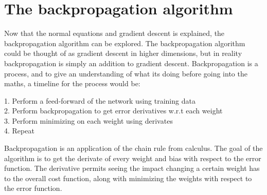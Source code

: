 \documentclass[a4paper,12pt]{article}
\begin{document}
\section{The backpropagation algorithm}
Now that the normal equations and gradient descent is explained, the backpropagation algorithm can be explored. The backpropagation algorithm could be thought of as gradient descent in higher dimensions, but in reality backpropagation is simply an addition to gradient descent. Backpropagation is a process, and to give an understanding of what its doing before going into the maths, a timeline for the process would be: 
\begin{center} 1. Perform a feed-forward of the network using training data
\\ 2. Perform backpropagation to get error derivatives w.r.t each weight
\\ 3. Perform minimizing on each weight using derivates
\\ 4. Repeat\end{center}
Backpropagation is an application of the chain rule from calculus. The goal of the algorithm is to get the derivate of every weight and bias with respect to the error function. The derivative permits seeing the impact changing a certain weight has to the overall cost function, along with minimizing the weights with respect to the error function. 
\end{document}
